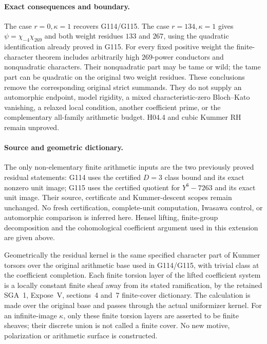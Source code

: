 \paragraph{Exact consequences and boundary.}
The case \(r=0,\kappa=1\) recovers G114/G115.  The case
\(r=134,\kappa=1\) gives \(\psi=\chi_{-4}\chi_{269}\)
and both weight residues \(133\) and \(267\), using the
quadratic identification already proved in G115.
For every fixed positive weight the finite-character theorem
includes arbitrarily high \(269\)-power conductors and
nonquadratic characters.  Their nonquadratic part may be tame
or wild; the tame part can be quadratic on the original
two weight residues.  These conclusions remove
the corresponding original strict summands.  They do not
supply an automorphic endpoint, model rigidity, a mixed
characteristic-zero Bloch--Kato vanishing, a relaxed local
condition, another coefficient prime, or the complementary
all-family arithmetic budget.  H04.4 and cubic Kummer RH
remain unproved.

\paragraph{Source and geometric dictionary.}
The only non-elementary finite arithmetic inputs are the two
previously proved residual statements: G114 uses the certified
\(D=3\) class bound and its exact nonzero unit image; G115 uses
the certified quotient for \(Y^6-7263\) and its exact unit image.
Their source, certificate and Kummer-descent scopes remain
unchanged.  No fresh certification, complete-unit computation,
Iwasawa control, or automorphic comparison is inferred here.
Hensel lifting, finite-group decomposition and the cohomological
coefficient argument used in this extension are given above.

Geometrically the residual kernel is the same specified
character part of Kummer torsors over the original arithmetic
base used in G114/G115, with trivial class at the coefficient
completion.  Each finite torsion layer of the lifted coefficient
system is a locally constant finite sheaf away from its stated
ramification, by the retained SGA~1, Expose~V, sections~4 and~7
finite-cover dictionary.  The calculation is made over the
original base and passes through the actual uniformizer kernel.
For an infinite-image \(\kappa\), only these finite torsion
layers are asserted to be finite sheaves; their discrete union
is not called a finite cover.  No new motive, polarization or
arithmetic surface is constructed.
